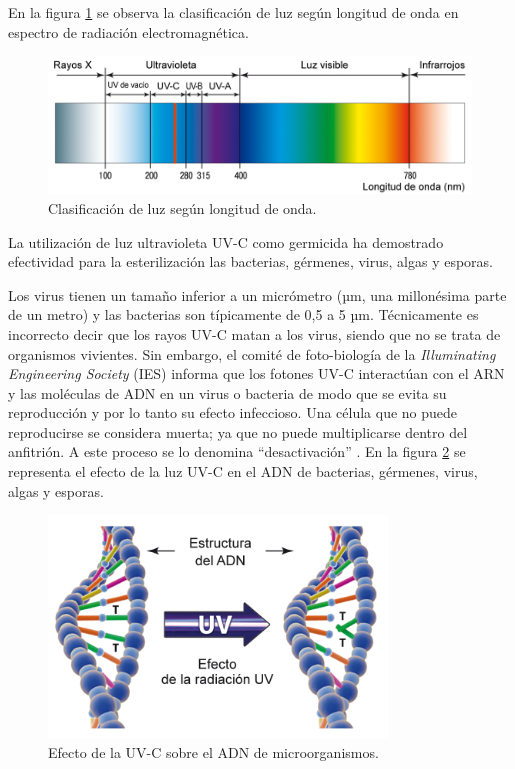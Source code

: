 En la  figura \ref{fig:espectro} se observa la  clasificación de luz según longitud de onda en  espectro de radiación electromagnética.

\begin{figure}[h]
	\centering
	\includegraphics[width=14cm]{./Figures/espectro.PNG}
	\caption{Clasificación de luz según longitud de onda\protect\footnotemark.}
	\label{fig:espectro}
\end{figure}


La utilización de luz ultravioleta UV-C como germicida ha demostrado efectividad para la esterilización  las bacterias, gérmenes, virus, algas y esporas. 

Los virus tienen un tamaño inferior a un micrómetro (µm, una millonésima parte de un metro) y las bacterias son típicamente de 0,5 a 5 µm. Técnicamente es incorrecto decir que los rayos  UV-C matan a los virus, siendo que no se trata de organismos vivientes. Sin embargo, el comité de foto-biología de la \emph{ Illuminating Engineering Society} (IES) informa que los fotones UV-C interactúan con el ARN y las moléculas de ADN en un virus o bacteria de modo que se evita su reproducción y por lo tanto su efecto infeccioso. Una célula que no puede reproducirse se considera muerta; ya que no puede multiplicarse dentro del anfitrión. A este proceso se lo denomina “desactivación”   \citep{IES}. En la figura \ref{fig:adn} se representa el efecto de la luz UV-C en el ADN de bacterias, gérmenes, virus, algas y esporas. 
 

\begin{figure}[h]
	\centering
	\includegraphics[width=9cm]{./Figures/adn.png}
	\caption{Efecto de la UV-C sobre el ADN de microorganismos\protect\footnotemark.}
	\label{fig:adn}
\end{figure}


